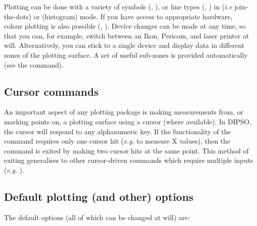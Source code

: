 \documentclass[twoside,11pt,noabs,nolof]{starlink}
\begin{document}
Plotting can be done with a variety of symbols (,  ),
or line types (,  )  in   (\emph{i.e}
join-the-dots) or   (histogram) mode. If you have access to
appropriate hardware, colour plotting is also possible (,
).  Device changes can be made at any time, so that you can, for
example, switch between an Ikon, Pericom, and laser printer at will.
Alternatively, you can stick to a single device and display data in
different zones of the plotting surface. A set of useful sub-zones is
provided automatically (see the   command).

\subsection {Cursor commands}

An important aspect of any plotting package is making measurements
from, or marking points on, a plotting surface using a cursor (where
available). In DIPSO, the cursor will respond to any alphanumeric key.
If the functionality of the command requires only one cursor hit (\emph{e.g.}   to measure X values), then the command is exited by making
two cursor hits at the same point. This method of exiting generalises
to other cursor-driven commands which require multiple inputs (\emph{e.g.} ).

\subsection {Default plotting (and other) options}

The default options (all of which can be changed at will) are:
\end{document}
